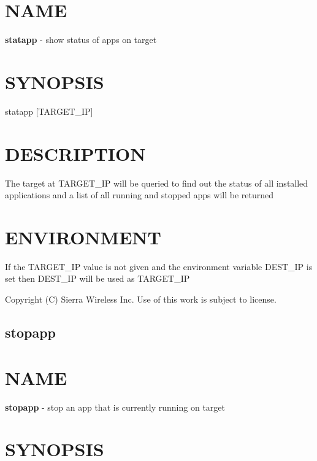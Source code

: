 \section*{N\+A\+M\+E}

{\bfseries statapp} -\/ show status of apps on target

\section*{S\+Y\+N\+O\+P\+S\+I\+S}

{\ttfamily statapp \mbox{[}T\+A\+R\+G\+E\+T\+\_\+\+I\+P\mbox{]}}~\newline


\section*{D\+E\+S\+C\+R\+I\+P\+T\+I\+O\+N}

The target at T\+A\+R\+G\+E\+T\+\_\+\+I\+P will be queried to find out the status of all installed applications and a list of all running and stopped apps will be returned

\section*{E\+N\+V\+I\+R\+O\+N\+M\+E\+N\+T}

\begin{DoxyVerb}If the TARGET_IP value is not given and the environment variable DEST_IP
is set then DEST_IP will be used as TARGET_IP
\end{DoxyVerb}




 Copyright (C) Sierra Wireless Inc. Use of this work is subject to license. \hypertarget{toolsHost_stopapp}{}\subsection{stopapp}\label{toolsHost_stopapp}
\section*{N\+A\+M\+E}

{\bfseries stopapp} -\/ stop an app that is currently running on target

\section*{S\+Y\+N\+O\+P\+S\+I\+S}

